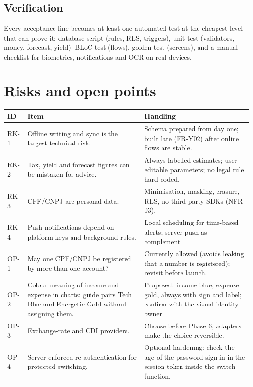 \documentclass[11pt,a4paper]{article}
\begin{document}
\subsection*{Verification}
Every acceptance line becomes at least one automated test at the cheapest level that can prove it: database script (rules, RLS, triggers), unit test (validators, money, forecast, yield), BLoC test (flows), golden test (screens), and a manual checklist for biometrics, notifications and OCR on real devices.

\section{Risks and open points}
\begin{tabularx}{\textwidth}{@{}l X X@{}}
\toprule
\textbf{ID} & \textbf{Item} & \textbf{Handling} \\
\midrule
RK-1 & Offline writing and sync is the largest technical risk. & Schema prepared from day one; built late (FR-Y02) after online flows are stable. \\
RK-2 & Tax, yield and forecast figures can be mistaken for advice. & Always labelled estimates; user-editable parameters; no legal rule hard-coded. \\
RK-3 & CPF/CNPJ are personal data. & Minimisation, masking, erasure, RLS, no third-party SDKs (NFR-03). \\
RK-4 & Push notifications depend on platform keys and background rules. & Local scheduling for time-based alerts; server push as complement. \\
OP-1 & May one CPF/CNPJ be registered by more than one account? & Currently allowed (avoids leaking that a number is registered); revisit before launch. \\
OP-2 & Colour meaning of income and expense in charts: guide pairs Tech Blue and Energetic Gold without assigning them. & Proposed: income blue, expense gold, always with sign and label; confirm with the visual identity owner. \\
OP-3 & Exchange-rate and CDI providers. & Choose before Phase 6; adapters make the choice reversible. \\
OP-4 & Server-enforced re-authentication for protected switching. & Optional hardening: check the age of the password sign-in in the session token inside the switch function. \\
\bottomrule
\end{tabularx}
\end{document}
